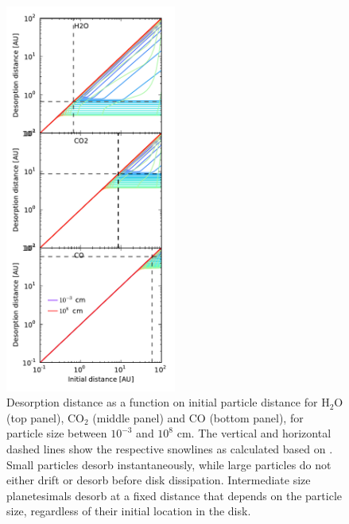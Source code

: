 \documentclass[12pt, preprint]{aastex}
\begin{document}
\begin{figure}[htb]
\centering
\includegraphics[width=0.5\textwidth]{../figs/desorption_distance_many_new_2.pdf}
\caption{Desorption distance as a function on initial particle distance for H$_2$O (top panel), CO$_2$ (middle panel) and CO (bottom panel), for particle size between $10^{-3}$ and $10^8$ cm. The vertical and horizontal dashed lines show the respective snowlines as calculated based on \citet{hollenbach09}. Small particles desorb instantaneously, while large particles do not either drift or desorb before disk dissipation. Intermediate size planetesimals desorb at a fixed distance that depends on the particle size, regardless of their initial location in the disk.} %
\label{fig:drift_dist}
\end{figure}
\end{document}
